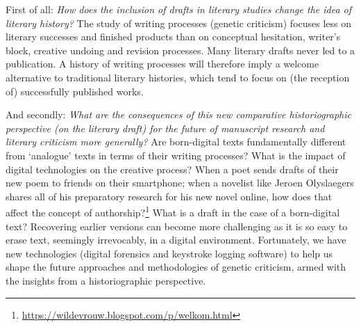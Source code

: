 \begin{preface}
First of all: \emph{How does the inclusion of drafts in literary studies
change the idea of literary history?} The study of writing processes
(genetic criticism) focuses less on literary successes and finished
products than on conceptual hesitation, writer's block, creative undoing
and revision processes. Many literary drafts never led to a publication.
A history of writing processes will therefore imply a welcome
alternative to traditional literary histories, which tend to focus on
(the reception of) successfully published works.

And secondly: \emph{What are the consequences of this new comparative
historiographic perspective (on the literary draft) for the future of
manuscript research and literary criticism more generally?} Are
born-digital texts fundamentally different from `analogue' texts in
terms of their writing processes? What is the impact of digital
technologies on the creative process? When a poet sends drafts of their
new poem to friends on their smartphone; when a novelist like Jeroen
Olyslaegers shares all of his preparatory research for his new novel
online, how does that affect the concept of authorship?\footnote{\url{https://wildevrouw.blogspot.com/p/welkom.html}}
What is a draft in the case of a born-digital text? Recovering earlier
versions can become more challenging as it is so easy to erase text,
seemingly irrevocably, in a digital environment. Fortunately, we have
new technologies (digital forensics and keystroke logging software) to
help us shape the future approaches and methodologies of genetic
criticism, armed with the insights from a historiographic perspective.


\begin{flushleft}
    \renewcommand*{\mkbibnamefamily}[1]{\textsc{#1}}
    \renewcommand*{\mkbibnamegiven}[1]{\textsc{#1}} 
\printbibliography
\end{flushleft}
\end{preface}